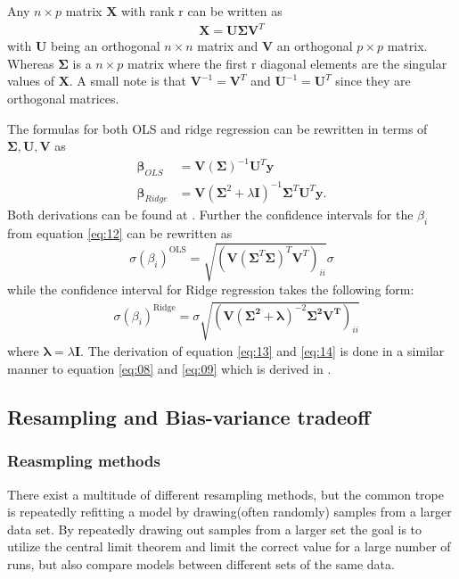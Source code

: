 \documentclass[uio,jmp,amsmath,amssymb,reprint,nofootinbib]{revtex4-1}
\numberwithin{equation}{section}
\newcommand{\lp}{\left(}
\newcommand{\rp}{\right)}
\begin{document}
Any \(n\times p\) matrix \(\bm{X}\) with rank r can be written as
\begin{align}
\bm{X} = \bm{U\Sigma V}^T
\end{align}
with \(\bm{U}\) being an orthogonal \({n\times n}\) matrix and \(\bm{V}\) an orthogonal \({p\times p}\) matrix. Whereas \(\bm{\Sigma}\) is a \(n\times p\) matrix where the first r diagonal elements are the singular values of \(\bm{X}\)\cite{MHJ_LinReg}. A small note is that \(\bm{V}^{-1} = \bm{V}^T\) and \(\bm{U}^{-1} = \bm{U}^T\) since they are orthogonal matrices.

The formulas for both OLS and ridge regression can be rewritten in terms of \(\bm{\Sigma, U, V}\) as
\begin{align}\label{eq:08}
\bm{\beta}_{OLS} &= \bm{V}(\bm{\Sigma})^{-1}\bm{U}^T\bm{y}\\ \label{eq:09}
\bm{\beta}_{Ridge} &= \bm{V}(\bm{\Sigma}^2 + \lambda\bm{I})^{-1}\bm{\Sigma}^T\bm{U}^T\bm{y}.
\end{align}
Both derivations can be found at \cite{SVD}. Further the confidence intervals for the \(\beta_i\) from equation \ref{eq:12} can be rewritten as
\begin{equation}\label{eq:13}
\sigma(\beta_i)^{\text{OLS}} =\sqrt{ \lp\bm{V}\lp\bm{\Sigma}^T\bm{\Sigma}\rp^{T}\bm{V}^T\rp_{ii}}\sigma
\end{equation}
while the confidence interval for Ridge regression takes the following form:
\begin{align}\label{eq:14}
&\sigma(\beta_i)^{\text{Ridge}} = \sigma \sqrt{ \lp\bm{V}\lp \bm{\Sigma^2 + \lambda}\rp^{-2}\bm{\Sigma^2}\bm{V^T}\rp_{ii}}
\end{align}
where \(\bm{\lambda} = \lambda\bm{I}\). The derivation of equation \ref{eq:13} and \ref{eq:14} is done in a similar manner to equation \ref{eq:08} and \ref{eq:09} which is derived in \cite{SVD}.


\subsection{Resampling and Bias-variance tradeoff}

\subsubsection{Reasmpling methods}

There exist a multitude of different resampling methods, but the common trope is repeatedly refitting a model by drawing(often randomly) samples from a larger data set. By repeatedly drawing out samples from a larger set the goal is to utilize the central limit theorem and limit the correct value for a large number of runs, but also compare models between different sets of the same data.
\end{document}
